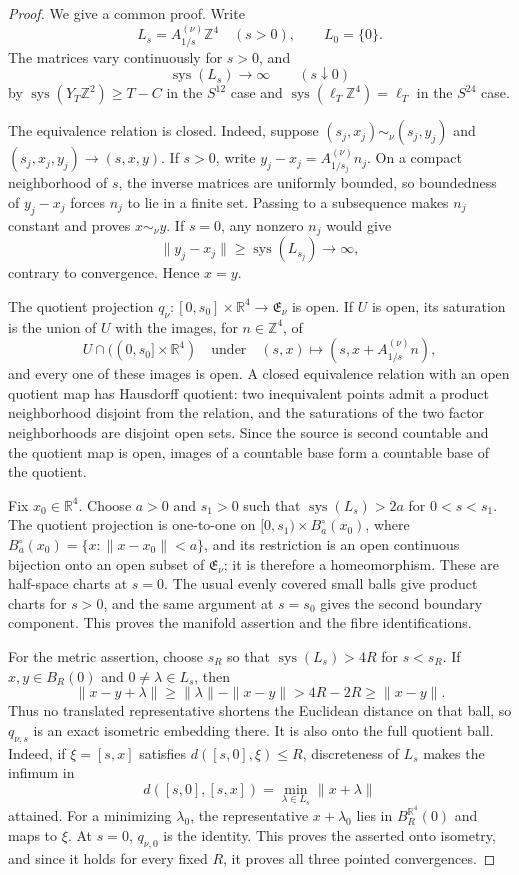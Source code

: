 \begin{proof}
We give a common proof.  Write
\[
 L_s=A_{1/s}^{(\nu)}\mathbb Z^4\quad(s>0),
 \qquad L_0=\{0\}.
\]
The matrices vary continuously for \(s>0\), and
\[
 \operatorname{sys}(L_s)\longrightarrow\infty
 \qquad(s\downarrow0)
\]
by \(\operatorname{sys}(Y_T\mathbb Z^2)\geq T-C\) in the
\(S^{12}\) case and \(\operatorname{sys}(\ell_T\mathbb Z^4)=\ell_T\)
in the \(S^{24}\) case.

The equivalence relation is closed.  Indeed, suppose
\((s_j,x_j)\sim_\nu(s_j,y_j)\) and
\((s_j,x_j,y_j)\to(s,x,y)\).  If \(s>0\), write
\(y_j-x_j=A_{1/s_j}^{(\nu)}n_j\).  On a compact neighborhood of \(s\),
the inverse matrices are uniformly bounded, so boundedness of
\(y_j-x_j\) forces \(n_j\) to lie in a finite set.  Passing to a
subsequence makes \(n_j\) constant and proves \(x\sim_\nu y\).  If
\(s=0\), any nonzero \(n_j\) would give
\[
 \|y_j-x_j\|\geq\operatorname{sys}(L_{s_j})\longrightarrow\infty,
\]
contrary to convergence.  Hence \(x=y\).

The quotient projection \(q_\nu:[0,s_0]\times\mathbb R^4\to
\mathfrak E_\nu\) is open.  If \(U\) is open, its saturation is the union
of \(U\) with the images, for \(n\in\mathbb Z^4\), of
\[
 U\cap((0,s_0]\times\mathbb R^4)
 \quad\text{under}\quad
 (s,x)\longmapsto(s,x+A_{1/s}^{(\nu)}n),
\]
and every one of these images is open.  A closed equivalence relation with
an open quotient map has Hausdorff quotient: two inequivalent points admit
a product neighborhood disjoint from the relation, and the saturations of
the two factor neighborhoods are disjoint open sets.  Since the source is
second countable and the quotient map is open, images of a countable base
form a countable base of the quotient.

Fix \(x_0\in\mathbb R^4\).  Choose \(a>0\) and \(s_1>0\) such that
\(\operatorname{sys}(L_s)>2a\) for \(0<s<s_1\).  The quotient projection
is one-to-one on
\([0,s_1)\times B_a^\circ(x_0)\), where
\(B_a^\circ(x_0)=\{x:\|x-x_0\|<a\}\), and its restriction is an open continuous
bijection onto an open subset of \(\mathfrak E_\nu\); it is therefore a
homeomorphism.  These are half-space charts at \(s=0\).  The usual evenly
covered small balls give product charts for \(s>0\), and the same argument
at \(s=s_0\) gives the second boundary component.  This proves the
manifold assertion and the fibre identifications.

For the metric assertion, choose \(s_R\) so that
\(\operatorname{sys}(L_s)>4R\) for \(s<s_R\).  If
\(x,y\in B_R(0)\) and \(0\ne\lambda\in L_s\), then
\[
 \|x-y+\lambda\|
 \geq\|\lambda\|-\|x-y\|
 >4R-2R\geq\|x-y\|.
\]
Thus no translated representative shortens the Euclidean distance on that
ball, so \(q_{\nu,s}\) is an exact isometric embedding there.  It is also
onto the full quotient ball.  Indeed, if \(\xi=[s,x]\) satisfies
\(d([s,0],\xi)\leq R\), discreteness of \(L_s\) makes the infimum in
\[
 d([s,0],[s,x])=\min_{\lambda\in L_s}\|x+\lambda\|
\]
attained.  For a minimizing \(\lambda_0\), the representative
\(x+\lambda_0\) lies in \(B_R^{\mathbb R^4}(0)\) and maps to \(\xi\).  At
\(s=0\), \(q_{\nu,0}\) is the identity.  This proves the asserted onto
isometry, and since it holds for every fixed \(R\), it proves all three
pointed convergences.


\end{proof}

